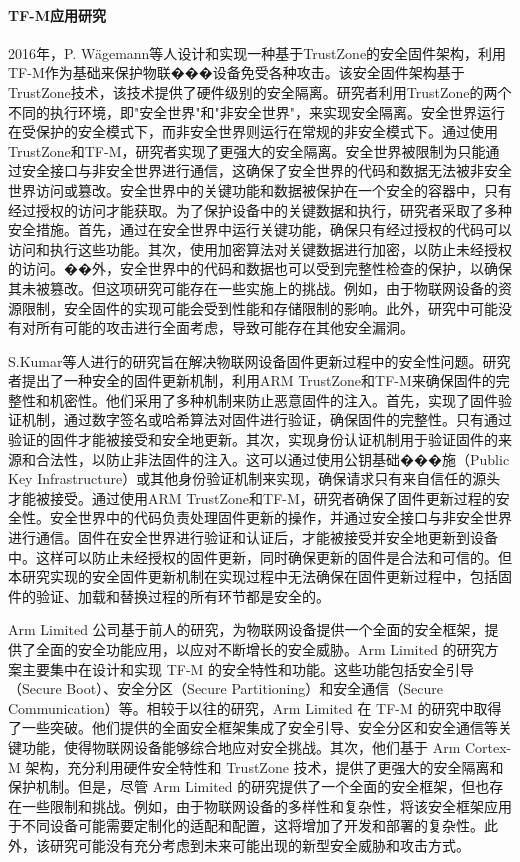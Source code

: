 \documentclass[12pt,a4paper]{ctexart}
\numberwithin{figure}{section}
\begin{document}
\paragraph{TF-M应用研究}
\par 2016年，P. Wägemann等人\cite{trustzone-firmware}设计和实现一种基于TrustZone的安全固件架构，利用TF-M作为基础来保护物联���设备免受各种攻击。该安全固件架构基于TrustZone技术，该技术提供了硬件级别的安全隔离。研究者利用TrustZone的两个不同的执行环境，即"安全世界"和"非安全世界"，来实现安全隔离。安全世界运行在受保护的安全模式下，而非安全世界则运行在常规的非安全模式下。通过使用TrustZone和TF-M，研究者实现了更强大的安全隔离。安全世界被限制为只能通过安全接口与非安全世界进行通信，这确保了安全世界的代码和数据无法被非安全世界访问或篡改。安全世界中的关键功能和数据被保护在一个安全的容器中，只有经过授权的访问才能获取。为了保护设备中的关键数据和执行，研究者采取了多种安全措施。首先，通过在安全世界中运行关键功能，确保只有经过授权的代码可以访问和执行这些功能。其次，使用加密算法对关键数据进行加密，以防止未经授权的访问。��外，安全世界中的代码和数据也可以受到完整性检查的保护，以确保其未被篡改。但这项研究可能存在一些实施上的挑战。例如，由于物联网设备的资源限制，安全固件的实现可能会受到性能和存储限制的影响。此外，研究中可能没有对所有可能的攻击进行全面考虑，导致可能存在其他安全漏洞。
\par S.Kumar等人进行的研究\cite{secure-firmware-updates}旨在解决物联网设备固件更新过程中的安全性问题。研究者提出了一种安全的固件更新机制，利用ARM TrustZone和TF-M来确保固件的完整性和机密性。他们采用了多种机制来防止恶意固件的注入。首先，实现了固件验证机制，通过数字签名或哈希算法对固件进行验证，确保固件的完整性。只有通过验证的固件才能被接受和安全地更新。其次，实现身份认证机制用于验证固件的来源和合法性，以防止非法固件的注入。这可以通过使用公钥基础���施（Public Key Infrastructure）或其他身份验证机制来实现，确保请求只有来自信任的源头才能被接受。通过使用ARM TrustZone和TF-M，研究者确保了固件更新过程的安全性。安全世界中的代码负责处理固件更新的操作，并通过安全接口与非安全世界进行通信。固件在安全世界进行验证和认证后，才能被接受并安全地更新到设备中。这样可以防止未经授权的固件更新，同时确保更新的固件是合法和可信的。但本研究实现的安全固件更新机制在实现过程中无法确保在固件更新过程中，包括固件的验证、加载和替换过程的所有环节都是安全的。
\par  Arm Limited 公司\cite{trusted-firmware}基于前人的研究，为物联网设备提供一个全面的安全框架，提供了全面的安全功能应用，以应对不断增长的安全威胁。Arm Limited 的研究方案主要集中在设计和实现 TF-M 的安全特性和功能。这些功能包括安全引导（Secure Boot）、安全分区（Secure Partitioning）和安全通信（Secure Communication）等。相较于以往的研究，Arm Limited 在 TF-M 的研究中取得了一些突破。他们提供的全面安全框架集成了安全引导、安全分区和安全通信等关键功能，使得物联网设备能够综合地应对安全挑战。其次，他们基于 Arm Cortex-M 架构，充分利用硬件安全特性和 TrustZone 技术，提供了更强大的安全隔离和保护机制。但是，尽管 Arm Limited 的研究提供了一个全面的安全框架，但也存在一些限制和挑战。例如，由于物联网设备的多样性和复杂性，将该安全框架应用于不同设备可能需要定制化的适配和配置，这将增加了开发和部署的复杂性。此外，该研究可能没有充分考虑到未来可能出现的新型安全威胁和攻击方式。
\end{document}
